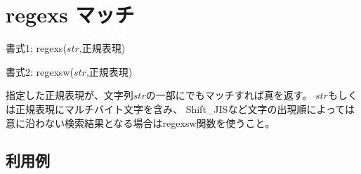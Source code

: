 
%

\section{regexs マッチ\label{sect:regexs}}

書式1: regexs($str$,正規表現)

書式2: regexsw($str$,正規表現)

指定した正規表現が、文字列$str$の一部にでもマッチすれば真を返す。
$str$もしくは正規表現にマルチバイト文字を含み、
Shift\_JISなど文字の出現順によっては意に沿わない検索結果となる場合はregexsw関数を使うこと。

\subsection*{利用例}


%

